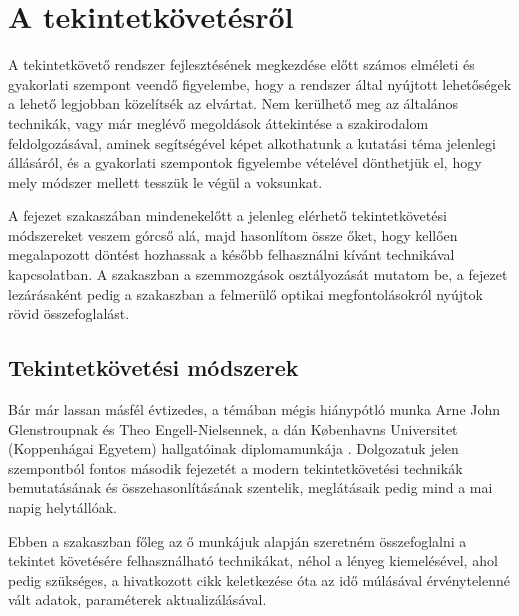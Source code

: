 \chapter{A tekintetkövetésről}\label{sect:tekintetkovetes}

A tekintetkövető rendszer fejlesztésének megkezdése előtt számos elméleti és gyakorlati szempont veendő figyelembe, hogy a rendszer által nyújtott lehetőségek a lehető legjobban közelítsék az elvártat. Nem kerülhető meg az általános technikák, vagy már meglévő megoldások áttekintése a szakirodalom feldolgozásával, aminek segítségével képet alkothatunk a kutatási téma jelenlegi állásáról, és a gyakorlati szempontok figyelembe vételével dönthetjük el, hogy mely módszer mellett tesszük le végül a voksunkat.

\bigskip

A fejezet  szakaszában mindenekelőtt a jelenleg elérhető tekintetkövetési módszereket veszem górcső alá, majd hasonlítom össze őket, hogy kellően megalapozott döntést hozhassak a később felhasználni kívánt technikával kapcsolatban. A  szakaszban a szemmozgások osztályozását mutatom be, a fejezet lezárásaként pedig a  szakaszban a felmerülő optikai megfontolásokról nyújtok rövid összefoglalást.

\section{Tekintetkövetési módszerek}\label{sect:modszerek}

Bár már lassan másfél évtizedes, a témában mégis hiánypótló munka Arne John Glenstroupnak és Theo Engell-Nielsennek, a dán Københavns Universitet (Koppenhágai Egyetem) hallgatóinak diplomamunkája \cite{eye_media}. Dolgozatuk jelen szempontból fontos második fejezetét a modern tekintetkövetési technikák bemutatásának és összehasonlításának szentelik, meglátásaik pedig mind a mai napig helytállóak.

\bigskip

Ebben a szakaszban főleg az ő munkájuk alapján szeretném összefoglalni a tekintet követésére felhasználható technikákat, néhol a lényeg kiemelésével, ahol pedig szükséges, a hivatkozott cikk keletkezése óta az idő múlásával érvénytelenné vált adatok, paraméterek aktualizálásával.

